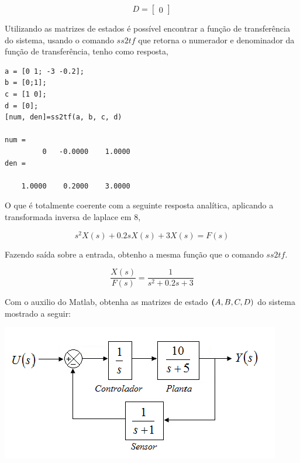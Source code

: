 \documentclass[a4paper, 10pt]{article}
\begin{document}
\begin{list}{\textbf{Questão .}}{
\setlength{\labelwidth}{-2mm} \setlength{\parsep}{0mm}
\setlength{\topsep}{0mm} \setlength{\leftmargin}{0mm}}
        $$
        D = \left[\begin{array}{r}
        0 
        \end{array}\right]
        $$ 
        
        Utilizando as matrizes de estados é possível encontrar
        a função de transferência do sistema, usando o comando       
        $ss2tf$ que retorna o numerador e denominador da função
        de transferência, tenho como resposta,
        
        
		\begin{lstlisting}
a = [0 1; -3 -0.2];
b = [0;1];
c = [1 0];
d = [0];
[num, den]=ss2tf(a, b, c, d)

num = 
         0   -0.0000    1.0000
den =

    1.0000    0.2000    3.0000
		\end{lstlisting}   
        
        O que é totalmente coerente com a seguinte resposta 
        analítica, aplicando a transformada
        inversa de laplace em 8,
        
        $$
        s^2 X(s) + 0.2 s X(s) + 3 X(s) = F(s)
        $$
        
        Fazendo saída sobre a entrada, obtenho a mesma
        função que o comando $ss2tf$.
        
        \begin{equation}
        \frac{X(s)}{F(s)} = \frac{1}{s^2 + 0.2 s + 3}
        \end{equation}




\newpage
\item
    Com o auxilio do Matlab, obtenha as matrizes de estado $\textbf(A, B, C, D)$ do 
    sistema mostrado a seguir:
            \begin{center}
            \includegraphics[scale=0.6]{fig7.png}
            \end{center}


\end{list}
\end{document}
